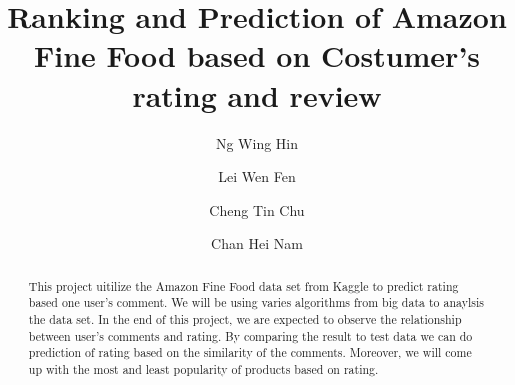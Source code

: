 \documentclass[sigconf]{acmart}
\begin{document}
\title{Ranking and Prediction of Amazon Fine Food based on Costumer's rating and review}

\author{Ng Wing Hin}

\author{Lei Wen Fen}

\author{Cheng Tin Chu}

\author{Chan Hei Nam}


\begin{abstract}
This project uitilize the Amazon Fine Food data set from Kaggle to predict rating based one user's comment. We will be using varies algorithms from big data to anaylsis the data set. In the end of this project, we are expected to observe the relationship between user's comments and rating. By comparing the result to test data we can do prediction of rating based on the similarity of the comments. Moreover, we will come up with the most and least popularity of products based on rating.
\end{abstract}
\maketitle



%
% 
\end{document}
